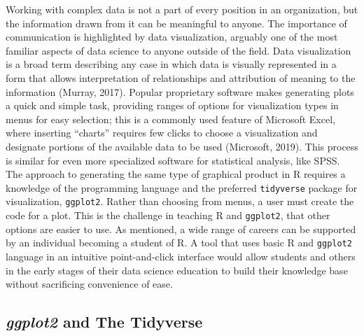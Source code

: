 \documentclass[english,man,floatsintext]{apa6}
\begin{document}
Working with complex data is not a part of every position in an organization, but the information drawn from it can be meaningful to anyone. The importance of communication is highlighted by data visualization, arguably one of the most familiar aspects of data science to anyone outside of the field. Data visualization is a broad term describing any case in which data is visually represented in a form that allows interpretation of relationships and attribution of meaning to the information (Murray, 2017). Popular proprietary software makes generating plots a quick and simple task, providing ranges of options for visualization types in menus for easy selection; this is a commonly used feature of Microsoft Excel, where inserting \enquote{charts} requires few clicks to choose a visualization and designate portions of the available data to be used (Microsoft, 2019). This process is similar for even more specialized software for statistical analysis, like SPSS.\\
The approach to generating the same type of graphical product in R requires a knowledge of the programming language and the preferred \texttt{tidyverse} package for visualization, \texttt{ggplot2}. Rather than choosing from menus, a user must create the code for a plot. This is the challenge in teaching R and \texttt{ggplot2}, that other options are easier to use. As mentioned, a wide range of careers can be supported by an individual becoming a student of R. A tool that uses basic R and \texttt{ggplot2} language in an intuitive point-and-click interface would allow students and others in the early stages of their data science education to build their knowledge base without sacrificing convenience of ease.

\hypertarget{ggplot2-and-the-tidyverse}{%
\subsection{\texorpdfstring{\emph{ggplot2} and The Tidyverse}{ggplot2 and The Tidyverse}}\label{ggplot2-and-the-tidyverse}}
\end{document}
